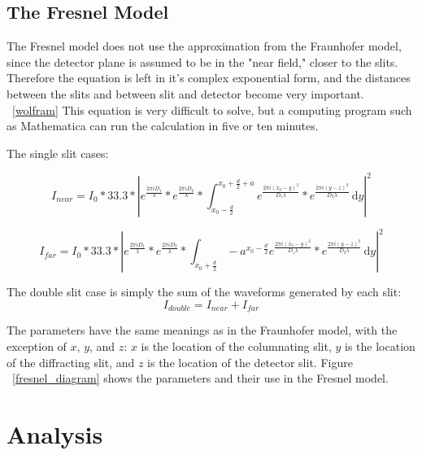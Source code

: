 \documentclass[prb,preprint]{revtex4-1}
\begin{document}

\subsection{The Fresnel Model}

The Fresnel model does not use the approximation from the Fraunhofer model, since the detector plane is assumed to be in the "near field," closer to the slits. Therefore the equation is left in it's complex exponential form, and the distances between the slits and between slit and detector become very important.  ~\ref{wolfram} This equation is very difficult to solve, but a computing program such as Mathematica can run the calculation in five or ten minutes.  

The single slit cases:


\begin{equation}
I_{near}=I_{0}*33.3*|e^{\frac{2 \pi i D_{1}}{\lambda}}*e^{\frac{2 \pi i D_{2}}{\lambda}}*\int_{x_{0}-\frac{d}{2}}^{x_{0}+\frac{d}{2}+a} \! e^{\frac{2 \pi i (x_{0}-y)^{2}}{D_{1} \lambda}}*e^{\frac{2 \pi i (y-z)^{2}}{D_{2} \lambda}} \, \mathrm{d}y |^{2}
\end{equation}

\begin{equation}
I_{far}=I_{0}*33.3*|e^{\frac{2 \pi i D_{1}}{\lambda}}*e^{\frac{2 \pi i D_{2}}{\lambda}}*\int_{x_{0}+\frac{d}{2}}-a^{x_{0}-\frac{d}{2}} \! e^{\frac{2 \pi i (x_{0}-y)^{2}}{D_{1} \lambda}}*e^{\frac{2 \pi i (y-z)^{2}}{D_{2} \lambda}} \, \mathrm{d}y |^{2}
\end{equation}

The double slit case is simply the sum of the waveforms generated by each slit: 
\begin{equation}
I_{double}=I_{near}+I_{far}
\end{equation}

The parameters have the same meanings as in the Fraunhofer model, with the exception of $x$, $y$, and $z$: $x$ is the location of the columnating slit, $y$ is the location of the diffracting slit, and $z$ is the location of the detector slit.  Figure ~\ref{fresnel_diagram} shows the parameters and their use in the Fresnel model.  


\section{Analysis}
\end{document}
